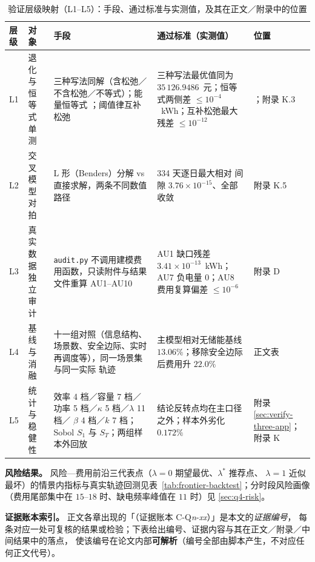 \begin{table}[htbp]
  \centering
  \caption{验证层级映射（L1--L5）：手段、通过标准与实测值，及其在正文／附录中的位置}
  \label{tab:lmap}
  \footnotesize
  \setlength{\tabcolsep}{4pt}
  \begin{tabularx}{\linewidth}{C{0.85cm} L{2.35cm} L{3.85cm} Y L{1.7cm}}
    \toprule
    层级 & 对象 & 手段 & 通过标准（实测值） & 位置 \\
    \midrule
    L1 & 退化与恒等式单测 & 三种写法同解（含松弛／不含松弛／不等式）；能量恒等式
         ；阈值律互补松弛 & 三种写法最优值同为 \(35\,126.9486\)~元；恒等式两侧差
         \(\le10^{-4}\)~kWh；互补松弛最大残差 \(\le10^{-12}\) & ；附录 K.3 \\
    L2 & 交叉模型对拍 & L 形（Benders）分解 vs 直接求解，两条不同数值路径 & 334 天逐日最大相对
         间隙 \(3.76\times10^{-15}\)、全部收敛 & 附录 K.5 \\
    L3 & 真实数据独立审计 & \texttt{audit.py} 不调用建模费用函数，只读附件与结果文件重算 AU1--AU10
         & AU1 缺口残差 \(3.41\times10^{-13}\)~kWh；AU7 负电量 \(0\)；AU8 费用复算偏差 \(\le10^{-6}\)
         & 附录 D \\
    L4 & 基线与消融 & 十一组对照（信息结构、场景数、安全边际、实时再调度等），同一场景集与同一实际
         轨迹 & 主模型相对无储能基线 \(13.06\%\)；移除安全边际后费用升 \(22.0\%\) &
         正文表~ \\
    L5 & 统计与稳健性 & 效率 4 档／容量 7 档／功率 5 档／\(\kappa\) 5 档／\(\lambda\) 11 档／
         \(\beta\) 4 档／\(k\) 7 档；Sobol \(S_1\) 与 \(S_T\)；两组样本外回放 & 结论反转点均在主口径
         之外；样本外劣化 \(0.172\%\) & 附录 \ref{sec:verify-three-app}；附录 K \\
    \bottomrule
  \end{tabularx}
\end{table}

\textbf{风险结果。} 风险—费用前沿三代表点（\(\lambda=0\) 期望最优、\(\lambda^{*}\) 推荐点、
\(\lambda=1\) 近似最坏）的情景内指标与真实轨迹回测见表~\ref{tab:frontier-backtest}；分时段风险画像
（费用尾部集中在 \(15\)--\(18\) 时、缺电频率峰值在 \(11\) 时）见 \ref{sec:q4-risk}。

\textbf{证据账本索引。} 正文各章出现的「（证据账本 C-Q\emph{n}-\emph{xx}）」是本文的\emph{证据编号}，
每条对应一处可复核的结果或检验；下表给出编号、证据内容与其在正文／附录／中间结果中的落点，
使该编号在论文内部\textbf{可解析}（编号全部由脚本产生，不对应任何正文代号）。

